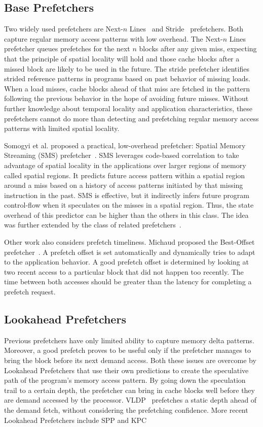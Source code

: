 \subsection{Base Prefetchers}

Two widely used prefetchers are Next-$n$ Lines~\cite{nextn} and
Stride~\cite{stride} prefetchers. Both capture regular memory access patterns
with low overhead. The Next-$n$ Lines prefetcher queues prefetches for the
next $n$ blocks after any given miss, expecting that the principle of spatial
locality will hold and those cache blocks after a missed block are likely to
be used in the future. The stride prefetcher identifies strided reference
patterns in programs based on past behavior of missing loads.  When a load
misses, cache blocks ahead of that miss are fetched in the pattern following
the previous behavior in the hope of avoiding future misses.  Without further
knowledge about temporal locality and application characteristics, these
prefetchers cannot do more than detecting and prefetching regular memory
access patterns with limited spatial locality.

Somogyi et al. proposed a practical, low-overhead prefetcher: Spatial Memory
Streaming (SMS) prefetcher~\cite{SMS}. SMS leverages code-based correlation to
take advantage of spatial locality in the applications over larger regions of
memory called spatial regions. It predicts future access pattern within a
spatial region around a miss based on a history of access patterns initiated
by that missing instruction in the past. SMS is effective, but it indirectly
infers future program control-flow when it speculates on the misses in a
spatial region. Thus, the state overhead of this predictor can be higher than
the others in this class. The idea was further extended by the class of
related prefetchers~\cite{STMS,Temporal_Instruction_Fetch}.

Other work also considers prefetch timeliness. Michaud proposed the
Best-Offset prefetcher~\cite{BOP}.  A prefetch offset is set automatically and
dynamically tries to adapt to the application behavior.  A good prefetch
offset is determined by looking at two recent access to a particular block
that did not happen too recently. The time between both accesses should be
greater than the latency for completing a prefetch request.

\subsection{Lookahead Prefetchers}
Previous prefetchers have only limited ability to capture memory delta
patterns. Moreover, a good prefetch proves to be useful only if the prefetcher
manages to bring the block before its next demand access. Both these issues
are overcome by Lookahead Prefetchers that use their own predictions to create
the speculative path of the program's memory access pattern. By going down the
speculation trail to a certain depth, the prefetcher can bring in cache blocks
well before they are demand accessed by the processor. VLDP~\cite{VLDP}
prefetches a static depth ahead of the demand fetch, without considering the
prefetching confidence. More recent Lookahead Prefetchers include SPP and
KPC~\cite{KPC}

